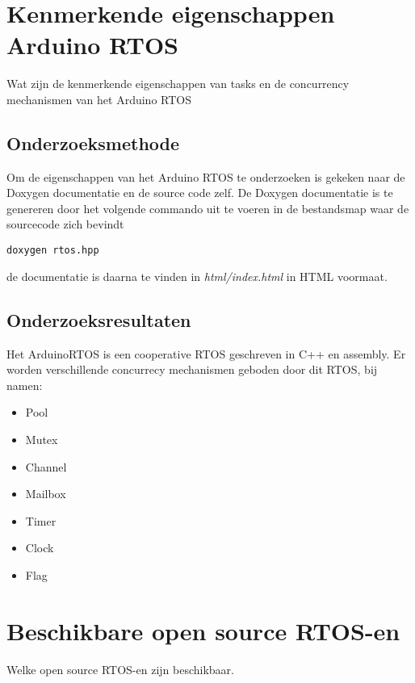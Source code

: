 \documentclass{article}
\begin{document}
\section{Kenmerkende eigenschappen Arduino RTOS}
Wat zijn de kenmerkende eigenschappen van tasks en de concurrency mechanismen van het Arduino RTOS
\subsection{Onderzoeksmethode}
Om de eigenschappen van het Arduino RTOS te onderzoeken is gekeken naar de Doxygen documentatie en de source code zelf.
De Doxygen documentatie is te genereren door het volgende commando uit te voeren in de bestandsmap waar de sourcecode zich bevindt
\begin{verbatim}
doxygen rtos.hpp
\end{verbatim}
de documentatie is daarna te vinden in \textit{html/index.html} in HTML voormaat.
\subsection{Onderzoeksresultaten}
Het ArduinoRTOS is een cooperative RTOS geschreven in C++ en assembly. Er worden verschillende concurrecy mechanismen geboden door dit RTOS, bij namen:
\begin{itemize}
\item Pool
\item Mutex
\item Channel
\item Mailbox
\item Timer
\item Clock
\item Flag
\end{itemize}

\section{Beschikbare open source RTOS-en}
Welke open source RTOS-en zijn beschikbaar.
\end{document}
